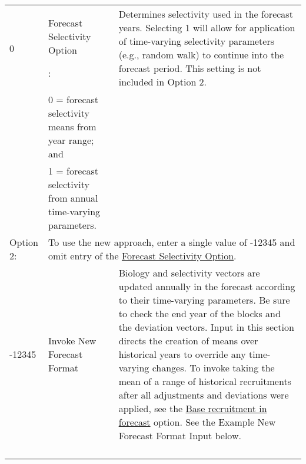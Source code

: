 \begin{landscape}
{\begin{longtable}{p{2cm} p{7cm} p{12cm}}
  0 & \hypertarget{FcastSelectivity}{Forecast Selectivity Option}: & \multirow{1}{1cm}[-0.15cm]{\parbox{12cm}{Determines selectivity used in the forecast years. Selecting 1 will allow for application of time-varying selectivity parameters (e.g., random walk) to continue into the forecast period. This setting is not included in Option 2.}} \\
    & 0 = forecast selectivity means from year range; and & \\
    & 1 = forecast selectivity from annual time-varying parameters. & \\

  Option 2: & \multicolumn{2}{l}{\multirow{1}{1cm}[-0.15cm]{\parbox{18.5cm}{To use the new approach, enter a single value of -12345 and omit entry of the \hyperlink{FcastSelectivity}{Forecast Selectivity Option}.}}} \Tstrut\Bstrut\\

  -12345 & Invoke New Forecast Format & \multirow{1}{1cm}[-0.15cm]{\parbox{12cm}{Biology and selectivity vectors are updated annually in the forecast according to their time-varying parameters. Be sure to check the end year of the blocks and the deviation vectors. Input in this section directs the creation of means over historical years to override any time-varying changes. To invoke taking the mean of a range of historical recruitments after all adjustments and deviations were applied, see the \hyperlink{FcastRecruitment}{Base recruitment in forecast} option. See the Example New Forecast Format Input below.}} \Bstrut\\
   & & \\
   & & \\
   & & \Tstrut\Bstrut\\
   & & \Tstrut\Bstrut\\
  

\end{longtable}}
\end{landscape}
